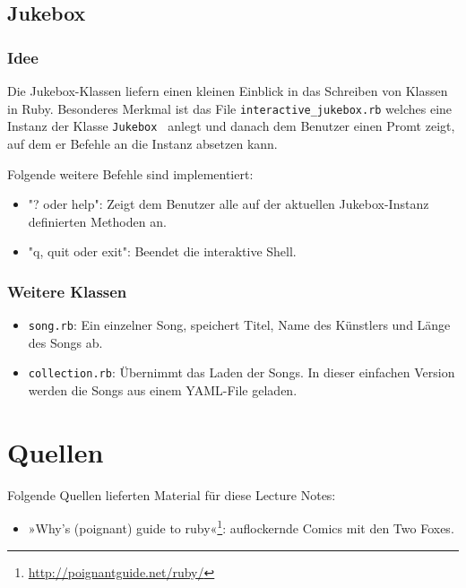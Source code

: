 \documentclass[a4book,11pt,twoside]{scrbook}
\begin{document}
\section{Jukebox}
\subsection*{Idee}
Die Jukebox-Klassen liefern einen kleinen Einblick in das Schreiben von Klassen in Ruby. Besonderes Merkmal ist das File \texttt{interactive\_jukebox.rb} welches eine Instanz der Klasse \texttt{Jukebox	} anlegt und danach dem Benutzer einen Promt zeigt, auf dem er Befehle an die Instanz absetzen kann.

Folgende weitere Befehle sind implementiert:

\begin{itemize}
\item "? oder help": Zeigt dem Benutzer alle auf der aktuellen Jukebox-Instanz definierten Methoden an.
\item "q, quit oder exit": Beendet die interaktive Shell.
\end{itemize}


\subsection*{Weitere Klassen}

\begin{itemize}
\item \texttt{song.rb}: Ein einzelner Song, speichert Titel, Name des Künstlers und Länge des Songs ab.
\item \texttt{collection.rb}: Übernimmt das Laden der Songs. In dieser einfachen Version werden die Songs aus einem YAML-File geladen. 
\end{itemize}








\chapter*{Quellen} %
\label{cha:quellen}
Folgende Quellen lieferten Material für diese Lecture Notes:

\begin{itemize}
	\item »Why's (poignant) guide to ruby«\footnote{\url{http://poignantguide.net/ruby/}}: auflockernde Comics mit den Two Foxes.
\end{itemize}
\end{document}

